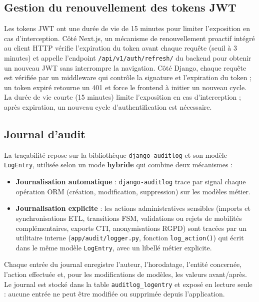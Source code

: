\subsection{Gestion du renouvellement des tokens JWT}

Les tokens JWT ont une durée de vie de 15 minutes pour limiter l'exposition en cas d'interception. Côté Next.js, un mécanisme de renouvellement proactif intégré au client HTTP vérifie l'expiration du token avant chaque requête (seuil à 3 minutes) et appelle l'endpoint \texttt{/api/v1/auth/refresh/} du backend pour obtenir un nouveau JWT sans interrompre la navigation. Côté Django, chaque requête est vérifiée par un middleware qui contrôle la signature et l'expiration du token ; un token expiré retourne un 401 et force le frontend à initier un nouveau cycle. La durée de vie courte (15 minutes) limite l'exposition en cas d'interception ; après expiration, un nouveau cycle d'authentification est nécessaire.

\subsection{Journal d'audit}

La traçabilité repose sur la bibliothèque \texttt{django-auditlog} et son modèle \texttt{LogEntry}, utilisée selon un mode \textbf{hybride} qui combine deux mécanismes :

\begin{itemize}
  \item \textbf{Journalisation automatique} : \texttt{django-auditlog} trace par signal chaque opération ORM (création, modification, suppression) sur les modèles métier.
  \item \textbf{Journalisation explicite} : les actions administratives sensibles (imports et synchronisations ETL, transitions FSM, validations ou rejets de mobilités complémentaires, exports CTI, anonymisations RGPD) sont tracées par un utilitaire interne (\texttt{app/audit/logger.py}, fonction \texttt{log\_action()}) qui écrit dans le même modèle \texttt{LogEntry}, avec un libellé métier explicite.
\end{itemize}

Chaque entrée du journal enregistre l'auteur, l'horodatage, l'entité concernée, l'action effectuée et, pour les modifications de modèles, les valeurs avant/après. Le journal est stocké dans la table \texttt{auditlog\_logentry} et exposé en lecture seule : aucune entrée ne peut être modifiée ou supprimée depuis l'application.

